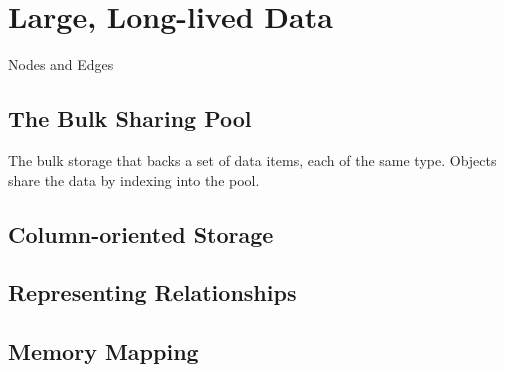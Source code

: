 
\chapter{Large, Long-lived Data}
\label{chapter:outisde-java-box}


\begin{example}{Nodes and Edges}

\end{example}

\section{The Bulk Sharing Pool}
\label{sec:bulk-sharing-pool}

The
bulk storage that backs a set of data items, each of the same type.
Objects share
the data by indexing into the pool.

\section{Column-oriented Storage}

\section{Representing Relationships}

\section{Memory Mapping}